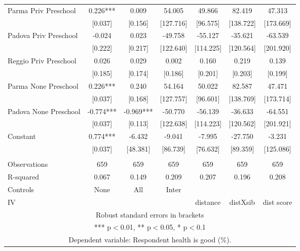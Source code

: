 \begin{tabular}{lcccccc}
Parma Priv Preschool & 0.226*** & 0.009 & 54.005 & 49.866 & 82.419 & 47.313 \\
 & [0.037] & [0.156] & [127.716] & [96.575] & [138.722] & [173.669] \\
Padova Priv Preschool & -0.024 & 0.023 & -49.758 & -55.127 & -35.621 & -63.539 \\
 & [0.222] & [0.217] & [122.640] & [114.225] & [120.564] & [201.920] \\
Reggio Priv Preschool & 0.026 & 0.029 & 0.002 & 0.160 & 0.219 & 0.139 \\
 & [0.185] & [0.174] & [0.186] & [0.201] & [0.203] & [0.199] \\
Parma None Preschool & 0.226*** & 0.240 & 54.164 & 50.022 & 82.587 & 47.471 \\
 & [0.037] & [0.168] & [127.757] & [96.601] & [138.769] & [173.714] \\
Padova None Preschool & -0.774*** & -0.969*** & -50.770 & -56.139 & -36.633 & -64.551 \\
 & [0.037] & [0.113] & [122.638] & [114.223] & [120.562] & [201.921] \\
Constant & 0.774*** & -6.432 & -9.041 & -7.995 & -27.750 & -3.231 \\
 & [0.037] & [48.381] & [86.739] & [76.632] & [89.359] & [125.086] \\
 &  &  &  &  &  &  \\
Observations & 659 & 659 & 659 & 659 & 659 & 659 \\
R-squared & 0.067 & 0.149 & 0.209 & 0.207 & 0.196 & 0.208 \\
Controls & None & All & Inter &  &  &  \\
 IV &  &  &  & distance & distXsib & dist score \\ \hline
\multicolumn{7}{c}{ Robust standard errors in brackets} \\
\multicolumn{7}{c}{ *** p$<$0.01, ** p$<$0.05, * p$<$0.1} \\
\multicolumn{7}{c}{ Dependent variable: Respondent health is good (\%).} \\
\end{tabular}
